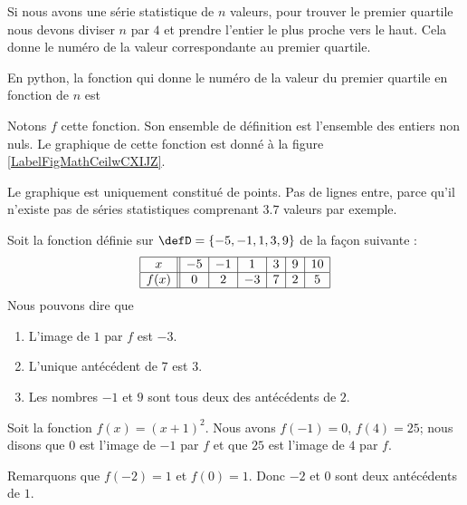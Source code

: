 \begin{example} \label{EqlaIGDz}
    Si nous avons une série statistique de \( n\) valeurs, pour trouver le premier quartile nous devons diviser \( n\) par \( 4\) et prendre l'entier le plus proche vers le haut. Cela donne le numéro de la valeur correspondante au premier quartile.

    En python, la fonction qui donne le numéro de la valeur du premier quartile en fonction de \( n\) est
    \begin{quote}
    \end{quote}
    Notons \( f\) cette fonction. Son ensemble de définition est l'ensemble des entiers non nuls. Le graphique de cette fonction est donné à la figure \ref{LabelFigMathCeilwCXIJZ}.
\newcommand{\CaptionFigMathCeilwCXIJZ}{Le numéro de la valeur du premier quartile en fonction du nombre de valeurs.}


    Le graphique est uniquement constitué de points. Pas de lignes entre, parce qu'il n'existe pas de séries statistiques comprenant \( 3.7\) valeurs par exemple. 
\end{example}


\begin{example}
    Soit la fonction définie sur \( \defD=\{ -5,-1,1,3,9 \}\) de la façon suivante :
    \begin{equation}
        \begin{array}[h]{|c||c|c|c|c|c|c|}
            \hline
            x&-5&-1&1&3&9&10\\
            \hline
            f(x)&0&2&-3&7&2&5\\
            \hline
        \end{array}
    \end{equation}
    Nous pouvons dire que
    \begin{enumerate}
        \item
            L'image de \( 1\) par \( f\) est \( -3\).
        \item
            L'unique antécédent de \( 7\) est \( 3\).
        \item
            Les nombres \( -1\) et \( 9\) sont tous deux des antécédents de \( 2\).
    \end{enumerate}
\end{example}

\begin{example}
    Soit la fonction \( f(x)=(x+1)^2\). Nous avons \( f(-1)=0\), \( f(4)=25\); nous disons que \( 0\) est l'image de \( -1\) par \( f\) et que \( 25\) est l'image de \( 4\) par \( f\).

    Remarquons que \( f(-2)=1\) et \( f(0)=1\). Donc \( -2\) et \( 0\) sont deux antécédents de \( 1\).
\end{example}

